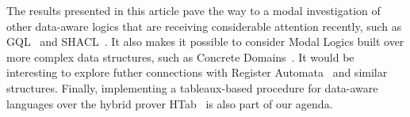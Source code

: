 
The results presented in this article pave the way to a modal investigation of other data-aware logics that are receiving considerable attention recently, such as GQL~\cite{FrancisGGLMMMPR23,FrancisGGLMMMPR23b} and SHACL~\cite{Ortiz23,Ahmetaj0S23}. It also makes it possible to consider Modal Logics built over more complex data structures, such as Concrete Domains~\cite{DemriQ21}. It would be interesting to explore futher connections with Register Automata~\cite{KaminskiF94} and similar structures. Finally, implementing a tableaux-based procedure for data-aware languages over the hybrid prover \textsf{HTab}~\cite{Hoffmann2007} is also part of our agenda.

